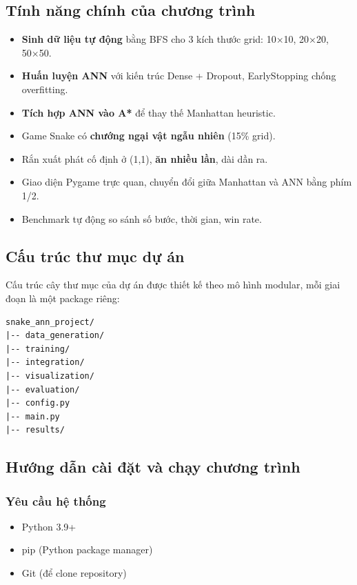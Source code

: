 \documentclass[12pt,a4paper]{article}
\begin{document}
\subsection{Tính năng chính của chương trình}

\begin{itemize}
    \item \textbf{Sinh dữ liệu tự động} bằng BFS cho 3 kích thước grid: 10×10, 20×20, 50×50.
    \item \textbf{Huấn luyện ANN} với kiến trúc Dense + Dropout, EarlyStopping chống overfitting.
    \item \textbf{Tích hợp ANN vào A*} để thay thế Manhattan heuristic.
    \item Game Snake có \textbf{chướng ngại vật ngẫu nhiên} (15\% grid).
    \item Rắn xuất phát cố định ở (1,1), \textbf{ăn nhiều lần}, dài dần ra.
    \item Giao diện Pygame trực quan, chuyển đổi giữa Manhattan và ANN bằng phím 1/2.
    \item Benchmark tự động so sánh số bước, thời gian, win rate.
\end{itemize}

\subsection{Cấu trúc thư mục dự án}

Cấu trúc cây thư mục của dự án được thiết kế theo mô hình modular, mỗi giai đoạn là một package riêng:

\begin{verbatim}
snake_ann_project/
|-- data_generation/
|-- training/
|-- integration/
|-- visualization/
|-- evaluation/
|-- config.py
|-- main.py
|-- results/
\end{verbatim}

\subsection{Hướng dẫn cài đặt và chạy chương trình}

\subsubsection{Yêu cầu hệ thống}

\begin{itemize}
    \item Python 3.9+
    \item pip (Python package manager)
    \item Git (để clone repository)
\end{itemize}
\end{document}
